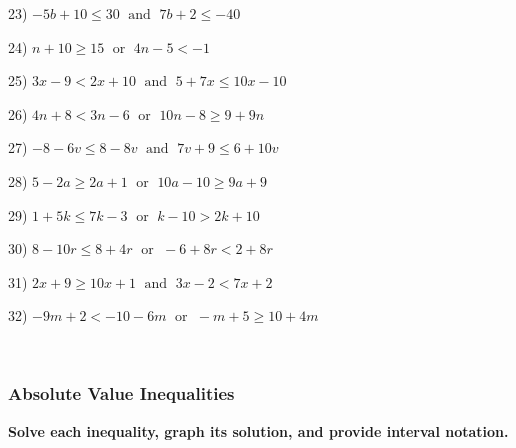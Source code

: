 \documentclass[11pt]{book}
\newcommand{\tmop}[1]{\ensuremath{\operatorname{#1}}}
\newcommand{\tmstrong}[1]{\textbf{#1}}
\theoremstyle{definition}  %
\begin{document}
  23) $- 5 b + 10 \leq 30 \tmop{~and~} 7 b + 2 \leq - 40$

  24) $n + 10 \geq 15 \tmop{~or~} 4 n - 5 < - 1$

	25) $3 x - 9 < 2 x + 10 \tmop{~and~} 5 + 7 x \leq 10 x - 10$
  	
  26) $4 n + 8 < 3 n - 6 \tmop{~or~} 10 n - 8 \geq 9 + 9 n$

  27) $- 8 - 6 v \leq 8 - 8 v \tmop{~and~} 7 v + 9 \leq 6 + 10 v$
  
  28) $5 - 2 a \geq 2 a + 1 \tmop{~or~} 10 a - 10 \geq 9 a + 9$
  
  29) $1 + 5 k \leq 7 k - 3 \tmop{~or~} k - 10 > 2 k + 10$
  
  30) $8 - 10 r \leq 8 + 4 r \tmop{~or~} - 6 + 8 r < 2 + 8 r$

  31) $2 x + 9 \geq 10 x + 1 \tmop{~and~} 3 x - 2 < 7 x + 2$

  32) $- 9 m + 2 < - 10 - 6 m \tmop{~or~} - m + 5 \geq 10 + 4 m$
  
\vspace{2in}
~

\pagebreak

\subsubsection{Absolute Value Inequalities}\par

{\tmstrong{Solve each inequality, graph its solution, and provide interval
notation.}}
\end{document}
